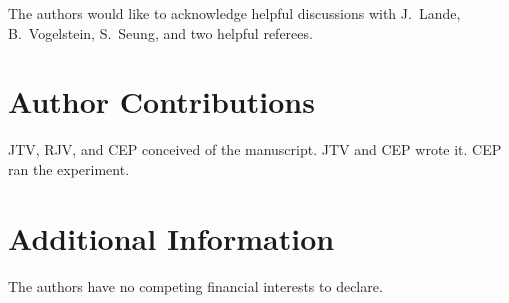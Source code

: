 \documentclass{article}
\begin{document}
The authors would like to acknowledge helpful discussions with J.~Lande, B.~Vogelstein, S.~Seung, and two helpful referees.

\section*{Author Contributions}

JTV, RJV, and CEP conceived of the manuscript.  JTV and CEP wrote it.  CEP ran the experiment.

\section*{Additional Information}

The authors have no competing financial interests to declare.
\end{document}
